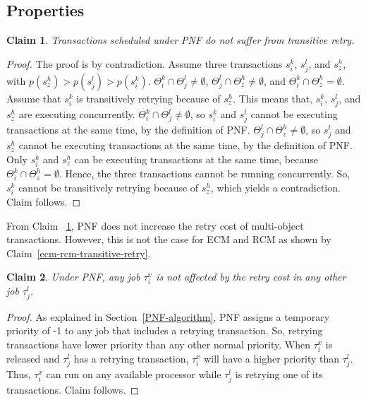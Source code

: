 \documentclass[twocolumn]{article}
\newtheorem{clm}{Claim}
\newtheorem{proof}{Proof}
\begin{document}

\subsection{Properties\label{pnf properties sec}}

\begin{clm}\label{PNF-transitive-retry}
Transactions scheduled under PNF do not suffer from transitive
retry.
\end{clm}
\begin{proof}\normalfont
The proof is by contradiction. Assume three transactions $s_i^k$, $s_j^l$, and $s_z^h$, with $p(s_z^h)>p(s_j^l)>p(s_i^k)$. $\Theta_i^k \cap \Theta_j^l \neq \emptyset$, $\Theta_j^l \cap \Theta_z^h \neq \emptyset$, and $\Theta_i^k \cap \Theta_z^h = \emptyset$. Assume that $s_i^k$ is transitively retrying because of $s_z^h$. This means that, $s_i^k$, $s_j^l$, and $s_z^h$ are executing concurrently. $\Theta_i^k \cap \Theta_j^l \neq \emptyset$, so $s_i^k$ and $s_j^l$ cannot be executing transactions at the same time, by the definition of PNF. $\Theta_j^l \cap \Theta_z^h \neq \emptyset$, so $s_j^l$ and $s_z^h$ cannot be executing transactions at the same time, by the definition of PNF. Only $s_i^k$ and $s_z^h$ can be executing transactions at the same time,  because $\Theta_i^k \cap \Theta_z^h = \emptyset$. Hence, the three transactions cannot be running concurrently. So, $s_i^k$ cannot be transitively retrying because of $s_z^h$, which yields a contradiction. Claim follows.
\end{proof}

From Claim~ \ref{PNF-transitive-retry},
 PNF does not increase the retry cost of multi-object transactions. However, this is not the case for ECM and RCM as shown by Claim~\ref{ecm-rcm-transitive-retry}. 

\begin{clm}\label{higher retry does not affect response}
Under PNF, any job $\tau_{i}^{x}$ is not affected by the retry cost in any other
job $\tau_{j}^{l}$.
\end{clm}
\begin{proof}\normalfont
As explained in Section~\ref{PNF-algorithm}, PNF assigns a temporary priority of -1 to any job that includes a retrying transaction. So, retrying transactions have lower priority than any other normal priority.
When $\tau_{i}^{x}$ is released and $\tau_j^l$ has a retrying transaction, $\tau_i^x$ will have a higher priority
than $\tau_j^l$. Thus, $\tau_i^x$ can run on any available processor while $\tau_j^l$ is retrying one of its transactions. Claim follows.
\end{proof}
\end{document}
